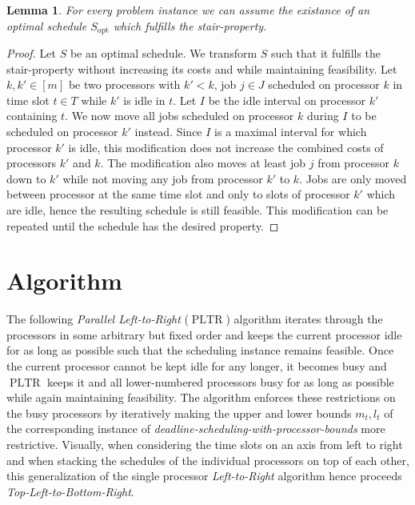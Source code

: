 \documentclass[a4paper]{article}
\DeclareMathOperator{\opt}{opt}
\DeclareMathOperator{\PLTR}{PLTR}
\newtheorem{lemma}[theorem]{Lemma}
\begin{document}
\begin{lemma}\label{lemma:stair_property_opt}
  For every problem instance we can assume the existance of an optimal schedule $S_{\opt}$ which fulfills the stair-property.
\end{lemma}
\begin{proof}
  Let $S$ be an optimal schedule.
  We transform $S$ such that it fulfills the stair-property without increasing its costs and while maintaining feasibility.
  Let $k, k' \in [m]$ be two processors with $k' < k$, job $j \in J$ scheduled on processor $k$ in time slot $t \in T$ while $k'$ is idle in $t$.
  Let $I$ be the idle interval on processor $k'$ containing $t$.
  We now move all jobs scheduled on processor $k$ during $I$ to be scheduled on processor $k'$ instead.
  Since $I$ is a maximal interval for which processor $k'$ is idle, this modification does not increase the combined costs of processors $k'$ and $k$.
  The modification also moves at least job $j$ from processor $k$ down to $k'$ while not moving any job from processor $k'$ to $k$.
  Jobs are only moved between processor at the same time slot and only to slots of processor $k'$ which are idle, hence the resulting schedule is still feasible.
  This modification can be repeated until the schedule has the desired property.
\end{proof}

\section{Algorithm}\label{section:algorithm}

The following \emph{Parallel Left-to-Right} ($\PLTR$) algorithm iterates through the processors in some arbitrary but fixed order and keeps the current processor idle for as long as possible such that the scheduling instance remains feasible.
Once the current processor cannot be kept idle for any longer, it becomes busy and $\PLTR$ keeps it and all lower-numbered processors busy for as long as possible while again maintaining feasibility.
The algorithm enforces these restrictions on the busy processors by iteratively making the upper and lower bounds $m_t, l_t$ of the corresponding instance of \emph{deadline-scheduling-with-processor-bounds} more restrictive.
Visually, when considering the time slots on an axis from left to right and when stacking the schedules of the individual processors on top of each other, this generalization of the single processor \emph{Left-to-Right} algorithm hence proceeds \emph{Top-Left-to-Bottom-Right}.
\end{document}
